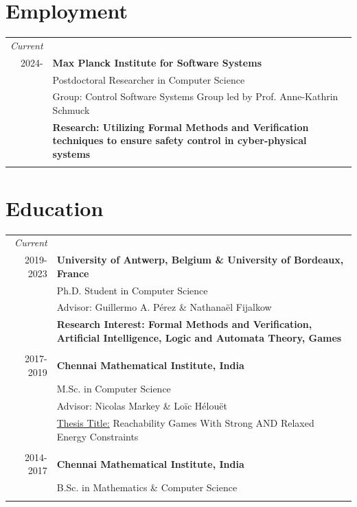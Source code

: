 \documentclass[a4paper,10pt]{article}
\begin{document}
\section{Employment}
\begin{tabular}{r|p{11cm}}
\emph{Current} & \\\textsc 2024-& \textbf{Max Planck Institute for Software Systems}\\
& Postdoctoral Researcher in Computer Science\\ 
& Group: Control Software Systems Group led by Prof. Anne-Kathrin Schmuck\\
& \textbf{Research: Utilizing Formal Methods and Verification techniques to ensure safety control in cyber-physical systems}\\&\\
\end{tabular}


\section{Education}
\begin{tabular}{r|p{11cm}}
\emph{Current} & \\\textsc 2019-2023& \textbf{University of Antwerp, Belgium \& University of Bordeaux, France}\\
& Ph.D. Student in Computer Science\\ 
& Advisor: Guillermo A. P\'erez \& Nathana\"el Fijalkow\\
& \textbf{Research Interest: Formal Methods and Verification, Artificial Intelligence, Logic and Automata Theory, Games}\\&\\
\textsc 2017-2019& \textbf{Chennai Mathematical Institute, India}\\
& M.Sc. in Computer Science
\\
& Advisor: Nicolas Markey \& Loïc Hélouët\\
& \href{https://ritamraha.github.io/thesis/raha_thesis.pdf}{Thesis Title:} Reachability Games With Strong AND Relaxed Energy Constraints\\&\\
\textsc 2014-2017& \textbf{Chennai Mathematical Institute, India}\\
& B.Sc. in Mathematics \& Computer Science
\\&\\
\end{tabular}
\end{document}
